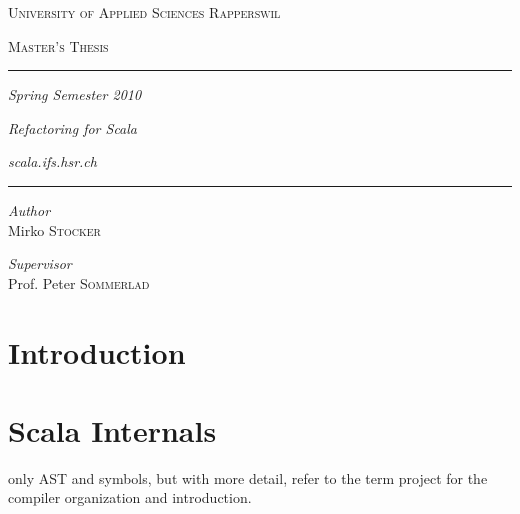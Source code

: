 \documentclass[10pt,a4paper,oneside]{scrreprt}
\begin{document}
\begin{titlepage}
 
\begin{center}
 
\textsc{\Large University of Applied Sciences Rapperswil}
 
\textsc{Master's Thesis}

\rule{0.83\textwidth}{0.4pt}

\vspace{0.2cm}

\normalsize{\textit{Spring Semester 2010}}

\vspace*{\fill}
 
\Huge{\textit{Refactoring for Scala}}

\vspace*{\fill}
\vspace{\baselineskip}

\normalsize{\textit{scala.ifs.hsr.ch}}

\rule{0.83\textwidth}{0.4pt}
\vskip0.35cm
\begin{minipage}{0.4\textwidth}
\begin{flushleft} \large
\emph{Author}\\
Mirko \textsc{Stocker}
\end{flushleft}
\end{minipage}
\begin{minipage}{0.4\textwidth}
\begin{flushright} \large
\emph{Supervisor} \\
Prof. Peter \textsc{Sommerlad}
\end{flushright}
\end{minipage}
 
\end{center}
 
\end{titlepage}



\newpage

\setcounter{tocdepth}{2}

\tableofcontents

\newpage


\chapter{Introduction}


\chapter{Scala Internals}
only AST and symbols, but with more detail, refer to the term project for the compiler organization and introduction.
\end{document}
